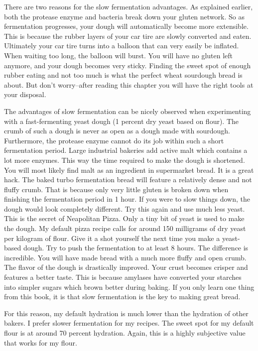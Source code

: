 There are two reasons for the slow fermentation advantages.
As explained earlier, both the protease enzyme and bacteria break down your
gluten network. So as fermentation progresses, your dough will automatically
become more extensible. This is because the rubber layers of your car tire
are slowly converted and eaten. Ultimately your car tire turns into a balloon
that can very easily be inflated. When waiting too long, the
balloon will burst. You will have no gluten left anymore, and your dough
becomes very sticky. Finding the sweet spot of enough rubber eating and not
too much is what the perfect wheat sourdough bread is about. But don't worry--after reading
this chapter you will have the right tools at your disposal.

The advantages of slow fermentation can be nicely observed when experimenting
with a fast-fermenting yeast dough (1 percent dry yeast based on flour). The
crumb of such a dough is never as
open as a dough made with sourdough. Furthermore, the protease enzyme
cannot do its job within such a short fermentation period.
Large industrial bakeries add active malt which contains a
lot more enzymes. This way the time required to make the dough is shortened. You
will most likely find malt as an ingredient in supermarket bread. It is a
great hack. The baked turbo fermentation bread will feature a relatively dense
and not fluffy crumb. That is because only very little gluten is broken down when
finishing the fermentation period in 1 hour. If you were to slow things down,
the dough would look completely different.
Try this again and use much less yeast. This is the
secret of Neapolitan Pizza. Only a tiny bit of yeast is used to make the
dough. My default pizza recipe calls for around 150 milligrams of dry
yeast per kilogram of flour. Give it a shot yourself the next time you
make a yeast-based dough. Try to push the fermentation to at least 8 hours.
The difference is incredible. You will have made bread with a much more
fluffy and open crumb. The flavor of the dough is drastically improved. Your
crust becomes crisper and features a better taste. This is because amylases have
converted your starches into simpler sugars which brown better during baking.
If you only learn one thing from this book, it is that slow fermentation is
the key to making great bread.

For this reason, my default hydration is much lower than the hydration of other
bakers. I prefer slower fermentation for my recipes.
The sweet spot for my default flour is at around 70 percent hydration.
Again, this is a highly subjective value that works for my flour.

